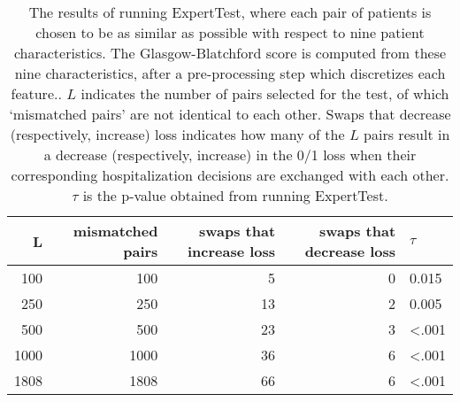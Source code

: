 \begin{table}[!htbp]
\centering
\begin{tabular}{rrrrl}
  \toprule L & mismatched pairs & swaps that increase loss & swaps that decrease loss & $\tau$ \\ 
  \midrule 100 & 100 & 5 & 0 & 0.015 \\ 
  250 & 250 & 13 & 2 & 0.005 \\ 
  500 & 500 & 23 & 3 & <.001 \\ 
  1000 & 1000 & 36 & 6 & <.001 \\ 
  1808 & 1808 & 66 & 6 & <.001 \\ 
   \bottomrule \end{tabular}
\caption{The results of running ExpertTest, where each pair of patients is chosen to be as similar as possible with respect to nine patient characteristics. The Glasgow-Blatchford score is computed from these nine characteristics, after a pre-processing step which discretizes each feature.. $L$ indicates the number of pairs selected for the test, of which `mismatched pairs' are not identical to each other.
                   Swaps that decrease (respectively, increase) loss indicates how many of the $L$ pairs result in a decrease (respectively, increase) in the 0/1 loss
                   when their corresponding hospitalization decisions are exchanged with each other. $\tau$ is the p-value obtained
                   from running ExpertTest.} 
\label{tab:testing for expertise raw}
\end{table}
